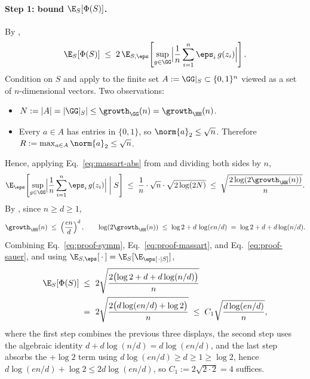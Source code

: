\paragraph{Step 1: bound $\E_S[\Phi(S)]$.}
By ,
\begin{align}\label{eq:proof-symm}
\E_S[\Phi(S)]
\;\le\; 2 \, \E_{S, \eps}\!\left[ \sup_{g \in \GG} \Bigl| \frac{1}{n} \sum_{i=1}^{n} \eps_i\, g(z_i) \Bigr| \right].
\end{align}
Condition on $S$ and apply  to the finite set $A := \GG|_S \subset \{0,1\}^n$ viewed as a set of $n$-dimensional vectors. Two observations:
\begin{itemize}[leftmargin=2em,itemsep=0.2em]
    \item $N := |A| = |\GG|_S| \le \growth_{\GG}(n) = \growth_{\HH}(n)$.
    \item Every $a \in A$ has entries in $\{0,1\}$, so $\norm{a}_2 \le \sqrt{n}$. Therefore $R := \max_{a \in A} \norm{a}_2 \le \sqrt{n}$.
\end{itemize}
Hence, applying Eq.~\eqref{eq:massart-abs} from  and dividing both sides by $n$,
\begin{align}\label{eq:proof-massart}
\E_{\eps}\!\left[ \sup_{g \in \GG} \Bigl| \frac{1}{n} \sum_{i=1}^{n} \eps_i\, g(z_i) \Bigr| \;\bigg|\; S \right]
\;\le\;
\frac{1}{n} \cdot \sqrt{n} \cdot \sqrt{2 \log(2 N)}
\;\le\;
\sqrt{\frac{2 \log(2 \growth_{\HH}(n))}{n}}.
\end{align}
By , since $n \ge d \ge 1$,
\begin{align}\label{eq:proof-sauer}
\growth_{\HH}(n) \;\le\; \left( \frac{e n}{d} \right)^{d},
\qquad
\log(2 \growth_{\HH}(n)) \;\le\; \log 2 + d \, \log(en/d) \;=\; \log 2 + d + d \log(n/d).
\end{align}
Combining Eq.~\eqref{eq:proof-symm}, Eq.~\eqref{eq:proof-massart}, and Eq.~\eqref{eq:proof-sauer}, and using $\E_{S,\eps}[\,\cdot\,] = \E_S[\E_\eps[\,\cdot \mid S]]$,
\begin{align}\label{eq:expect-bound}
\E_S[\Phi(S)]
\;\le\; & ~ 2 \sqrt{\frac{2 \bigl( \log 2 + d + d \log(n/d) \bigr)}{n}} \notag\\
\;=\; & ~ 2 \sqrt{\frac{2 \bigl( d \log(en/d) + \log 2 \bigr)}{n}}
\;\le\; C_1 \sqrt{\frac{d \log(en/d)}{n}},
\end{align}
where the first step combines the previous three displays, the second step uses the algebraic identity $d + d \log(n/d) = d \log(en/d)$, and the last step absorbs the $+ \log 2$ term using $d \log(en/d) \ge d \ge 1 \ge \log 2$, hence $d \log(en/d) + \log 2 \le 2 d \log(en/d)$, so $C_1 := 2 \sqrt{2 \cdot 2} = 4$ suffices.

